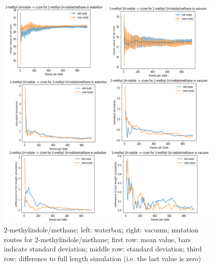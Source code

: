 \begin{figure}[!htb]
	
	\includegraphics[scale=0.9]{methylindole_short}\caption{2-methylindole/methane; left: waterbox; right: vacuum; mutation routes for 2-methylindole/methane; first row: mean value, bars indicate standard deviation; middle row: standard deviation; third row: difference to full length simulation (i.e. the last value is zero)}
	\label{fig:methylindole_short}
\end{figure}

